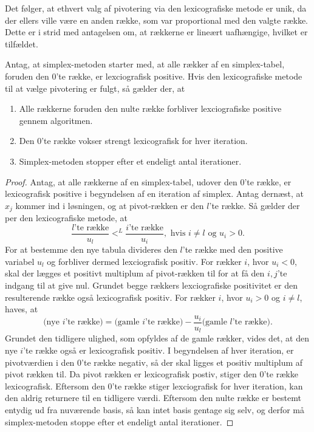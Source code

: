 Det følger, at ethvert valg af pivotering via den lexicografiske metode er unik, da der ellers ville være en anden række, som var proportional med den valgte række. 
Dette er i strid med antagelsen om, at rækkerne er lineært uafhængige, hvilket er tilfældet.
%
\begin{thm}{}{}
Antag, at simplex-metoden starter med, at alle rækker af en simplex-tabel, foruden den $0$'te række, er lexciografisk positive. Hvis den lexicografiske metode til at vælge pivotering er fulgt, så gælder der, at
\begin{enumerate}[label=(\alph*)]
\item Alle rækkerne foruden den nulte række forbliver lexciografiske positive gennem algoritmen.
\item Den $0$'te række vokser strengt lexicografisk for hver iteration.
\item Simplex-metoden stopper efter et endeligt antal iterationer. 
\end{enumerate}
\end{thm}
%
\begin{proof}
Antag, at alle rækkerne af en simplex-tabel, udover den $0$'te række, er lexicografisk positive i begyndelsen af en iteration af simplex. 
Antag dernæst, at $x_j$ kommer ind i løsningen, og at pivot-rækken er den $l$'te række. Så gælder der per den lexicografiske metode, at
$$\dfrac{l\text{'te række}}{u_l}<^L \dfrac{i\text{'te række}}{u_i}, \text{  hvis } i\neq l \text{ og }u_i>0.$$
For at bestemme den nye tabula divideres den $l$'te række med den positive variabel $u_l$ og forbliver dermed lexciografisk positiv.
For rækker $i$, hvor $u_i<0$, skal der lægges et positivt multiplum af pivot-rækken til for at få den $i,j$'te indgang til at give nul. 
Grundet begge rækkers lexciografiske positivitet er den resulterende række også lexicografisk positiv.
For rækker $i$, hvor $u_i>0$ og $i\neq l$, haves, at
$$\text{(nye }i\text{'te række)}=\text{(gamle }i\text{'te række)}-\dfrac{u_i}{u_l}\text{(gamle }l\text{'te række)}.$$
Grundet den tidligere ulighed, som opfyldes af de gamle rækker, vides det, at den nye $i$'te række også er lexicografisk positiv.
%
I begyndelsen af hver iteration, er pivotværdien i den $0$'te række negativ, så der skal ligges et positiv multiplum af pivot rækken til. 
Da pivot rækken er lexicografisk postiv, stiger den $0$'te række lexicografisk.
%
Eftersom den $0$'te række stiger lexciografisk for hver iteration, kan den aldrig returnere til en tidligere værdi.
Eftersom den nulte række er bestemt entydig ud fra nuværende basis, så kan intet basis gentage sig selv, og derfor må simplex-metoden stoppe efter et endeligt antal iterationer.
\end{proof}
%
%
%
%